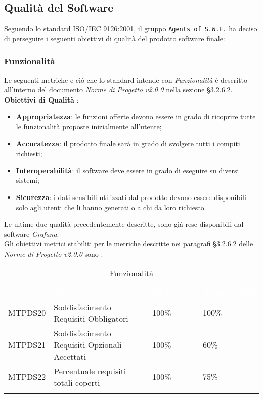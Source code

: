 \subsection{Qualità del Software}
\label{qs}
Seguendo lo standard ISO/IEC 9126:2001, il gruppo \texttt{Agents of S.W.E.} ha deciso di perseguire i seguenti obiettivi di qualità del prodotto software finale:

\subsubsection{Funzionalità}
\label{func}
Le seguenti metriche e ciò che lo standard intende con \textit{Funzionalità} è descritto all'interno del documento \textit{Norme di Progetto v2.0.0} nella sezione §3.2.6.2.\\

\textbf{Obiettivi di Qualità} :
\begin{itemize}
	\item \textbf{Appropriatezza}: le funzioni offerte devono essere in grado di ricoprire tutte le funzionalità proposte inizialmente all'utente;
	\item \textbf{Accuratezza}: il prodotto finale sarà in grado di svolgere tutti i compiti richiesti;
	\item \textbf{Interoperabilità}: il software deve essere in grado di eseguire su diversi sistemi;
	\item \textbf{Sicurezza}: i dati sensibili utilizzati dal prodotto devono essere disponibili solo agli utenti che li hanno generati o a chi da loro richiesto. 
\end{itemize}
Le ultime due qualità precedentemente descritte, sono già rese disponibili dal software \textit{Grafana}. \\
Gli obiettivi metrici stabiliti per le metriche descritte nei paragrafi §3.2.6.2 delle \textit{Norme di Progetto v2.0.0} sono : 

\begin{longtable}{|C{.15\textwidth}|C{.24\textwidth}|C{.24\textwidth}|C{.24\textwidth}|}
\hline
{}\textbf{\textcolor{white}{ID}} & \textbf{\textcolor{white}{Nome}} & \textbf{\textcolor{white}{Ottimalità}} & \textbf{\textcolor{white}{Accettabilità}}\\
MTPDS20 & Soddisfacimento Requisiti Obbligatori & 100\% & 100\%\\
\hline
{}MTPDS21 & Soddisfacimento Requisiti Opzionali Accettati & 100\% & 60\% \\
\hline
MTPDS22 & Percentuale requisiti totali coperti & 100\% & 75\% \\ 
\hline
\caption{Funzionalità}
\label{Funzionalità}
\end{longtable}

